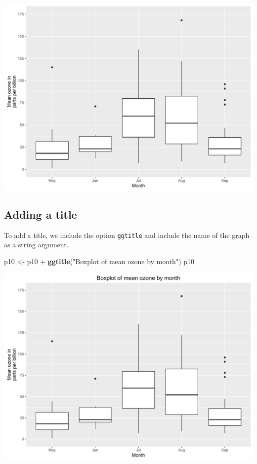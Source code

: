 \documentclass[]{article}
\newenvironment{Shaded}{\begin{snugshade}}{\end{snugshade}}
\newcommand{\KeywordTok}[1]{\textcolor[rgb]{0.13,0.29,0.53}{\textbf{{#1}}}}
\newcommand{\StringTok}[1]{\textcolor[rgb]{0.31,0.60,0.02}{{#1}}}
\newcommand{\NormalTok}[1]{{#1}}
\begin{document}
\begin{center}\includegraphics{0_all_posts_pdf/box_4-1} \end{center}

\subsection{Adding a title}\label{adding-a-title-3}

To add a title, we include the option \texttt{ggtitle} and include the
name of the graph as a string argument.

\begin{Shaded}
\begin{Highlighting}[]
\NormalTok{p10 <-}\StringTok{ }\NormalTok{p10 +}\StringTok{ }\KeywordTok{ggtitle}\NormalTok{(}\StringTok{"Boxplot of mean ozone by month"}\NormalTok{)}
\NormalTok{p10}
\end{Highlighting}
\end{Shaded}

\begin{center}\includegraphics{0_all_posts_pdf/box_5-1} \end{center}
\end{document}
